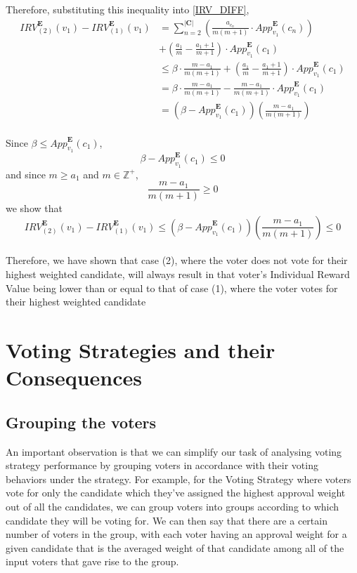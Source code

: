 \documentclass{article}
\begin{document}
Therefore, substituting this inequality into \eqref{IRV_DIFF},
\begin{equation}
\begin{aligned}
{IRV}^{\boldsymbol{E}}_{(2)}(v_1) - {IRV}^{\boldsymbol{E}}_{(1)}(v_1)
&=  \sum^{|\boldsymbol{C}|}_{n = 2}{\left(\frac{a_{c_{n}}}{m(m+1)}\cdot{App}^{\boldsymbol{E}}_{v_1}(c_{n})\right)}\\
&+ \left(\frac{a_1}{m}-\frac{a_{1}+1}{m+1}\right)\cdot{App}^{\boldsymbol{E}}_{v_1}(c_1)\\
&\leq \beta\cdot\frac{m-a_1}{m(m+1)} + \left(\frac{a_1}{m}-\frac{a_{1}+1}{m+1}\right)\cdot{App}^{\boldsymbol{E}}_{v_1}(c_1)\\
&= \beta\cdot\frac{m-a_1}{m(m+1)} - \frac{m-a_1}{m(m+1)}\cdot{App}^{\boldsymbol{E}}_{v_1}(c_1)\\
&= \left(\beta - {App}^{\boldsymbol{E}}_{v_1}(c_1)\right)\left(\frac{m-a_1}{m(m+1)}\right)
\end{aligned} 
\end{equation}\\

Since $\beta \leq {App}^{\boldsymbol{E}}_{v_1}(c_1)$,
\begin{equation}
     \beta - {App}^{\boldsymbol{E}}_{v_1}(c_1) \leq 0
\end{equation}
and since $m \geq a_1$ and $m \in \mathbb{Z}^+$,
\begin{equation}
     \frac{m-a_1}{m(m+1)} \geq 0
\end{equation}
we show that 
\begin{equation}
     {IRV}^{\boldsymbol{E}}_{(2)}(v_1) - {IRV}^{\boldsymbol{E}}_{(1)}(v_1) \leq \left(\beta - {App}^{\boldsymbol{E}}_{v_1}(c_1)\right)\left(\frac{m-a_1}{m(m+1)}\right) \leq 0
\end{equation}\\

Therefore, we have shown that case (2), where the voter does not vote for their highest weighted candidate, will always result in that voter's Individual Reward Value being lower than or equal to that of case (1), where the voter votes for their highest weighted candidate


\section{Voting Strategies and their Consequences}
\subsection{Grouping the voters}
An important observation is that we can simplify our task of analysing voting strategy performance by grouping voters in accordance with their voting behaviors under the strategy. For example, for the Voting Strategy where voters vote for only the candidate which they've assigned the highest approval weight out of all the candidates, we can group voters into groups according to which candidate they will be voting for. We can then say that there are a certain number of voters in the group, with each voter having an approval weight for a given candidate that is the averaged weight of that candidate among all of the input voters that gave rise to the group.
\end{document}
